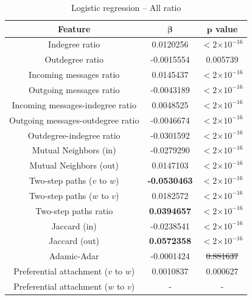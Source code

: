 \documentclass[conference]{IEEEtran}
\providecommand{\e}[1]{\ensuremath{\times 10^{#1}}}
\begin{document}
\begin{table}[!t]
\renewcommand{\arraystretch}{1.3}
\caption{Logistic regression -- All ratio}
\label{table_recresults_lograll2}
\centering
\begin{tabular}{|c||c|c|}
\hline
\bf{Feature} & $\mathbf{\beta}$ & $\mathbf{p}$ value \\
\hline
Indegree ratio     &    0.0120256  & $< 2 \e{-16} $\\
Outdegree ratio    &   -0.0015554  & 0.005739 \\
Incoming messages ratio    &    0.0145437  & $< 2 \e{-16} $\\
Outgoing messages ratio   &   -0.0043189  & $< 2 \e{-16} $\\
Incoming messages-indegree ratio   & 0.0048525   & $< 2 \e{-16} $ \\
Outgoing messages-outdegree ratio   & -0.0046674 & $< 2 \e{-16} $ \\
Outdegree-indegree ratio  &  -0.0301592  & $< 2 \e{-16} $\\
\hline
Mutual Neighbors (in) & -0.0279290  &$< 2 \e{-16} $\\
Mutual Neighbors (out) & 0.0147103  & $< 2 \e{-16} $\\
Two-step paths ($v$ to $w$)  &  \bf{-0.0530463}   & $< 2 \e{-16} $\\
Two-step paths ($w$ to $v$)   &    0.0182572   & $< 2 \e{-16} $\\
\hline
Two-step paths ratio  &   \bf{0.0394657} & $< 2 \e{-16} $\\
Jaccard (in) & -0.0238541 & $< 2 \e{-16} $\\
Jaccard (out) &   \bf{0.0572358}  & $< 2 \e{-16} $\\
Adamic-Adar  &    -0.0001424 & \sout{0.881637} \\
Preferential attachment ($v$ to $w$) & 0.0010837  & 0.000627 \\
Preferential attachment ($w$ to $v$)  &  - & -  \\
\hline
\end{tabular}
\end{table}
\end{document}
